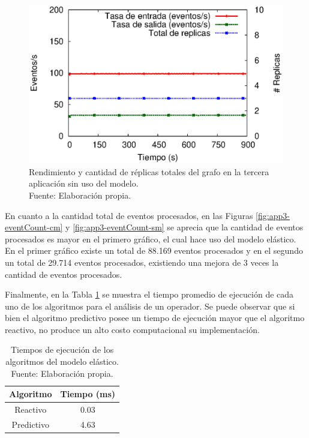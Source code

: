 \begin{figure}[!ht]
	\centering
	\captionsetup{justification=centering}
	\includegraphics[scale=0.7]{images/exp/app3/sm/logical/processSystem.eps}
    \caption[Rendimiento y cantidad de r\'eplicas totales del grafo en la tercera aplicaci\'on sin uso del modelo.]{Rendimiento y cantidad de r\'eplicas totales del grafo en la tercera aplicaci\'on sin uso del modelo.\\Fuente: Elaboraci\'on propia.}
	\label{fig:app3-processSystem-sm}
\end{figure}

En cuanto a la cantidad total de eventos procesados, en las Figuras \ref{fig:app3-eventCount-cm} y \ref{fig:app3-eventCount-sm} se aprecia que la cantidad de eventos procesados es mayor en el primero gr\'afico, el cual hace uso del modelo el\'astico. En el primer gr\'afico existe un total de 88.169 eventos procesados y en el segundo un total de 29.714 eventos procesados, existiendo una mejora de 3 veces la cantidad de eventos procesados.


Finalmente, en la Tabla \ref{tab:tiempo-algoritmos} se muestra el tiempo promedio de ejecuci\'on de cada uno de los algoritmos para el an\'alisis de un operador. Se puede observar que si bien el algoritmo predictivo posee un tiempo de ejecuci\'on mayor que el algoritmo reactivo, no produce un alto costo computacional su implementaci\'on.

\begin{table}[!ht]
\centering
\captionsetup{justification=centering}
\caption[Tiempos de ejecuci\'on de los algoritmos del modelo el\'astico.]{Tiempos de ejecuci\'on de los algoritmos del modelo el\'astico.\\Fuente: Elaboraci\'on propia.}
\begin{tabular}{| c | c |}
\hline
Algoritmo & Tiempo (ms) \\ \hline
Reactivo & 0.03 \\
Predictivo & 4.63 \\ \hline
\end{tabular}
\label{tab:tiempo-algoritmos}
\end{table}

